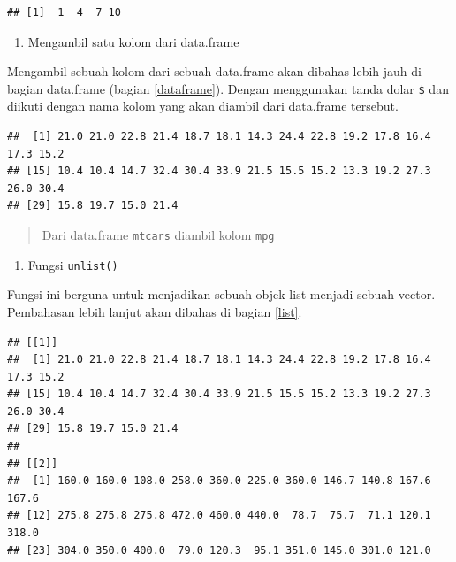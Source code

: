 \documentclass[]{book}
\newenvironment{Shaded}{\begin{snugshade}}{\end{snugshade}}
\newcommand{\KeywordTok}[1]{\textcolor[rgb]{0.13,0.29,0.53}{\textbf{#1}}}
\newcommand{\NormalTok}[1]{#1}
\newcommand{\OperatorTok}[1]{\textcolor[rgb]{0.81,0.36,0.00}{\textbf{#1}}}
\newcommand{\StringTok}[1]{\textcolor[rgb]{0.31,0.60,0.02}{#1}}
\providecommand{\tightlist}{%
  \setlength{\itemsep}{0pt}\setlength{\parskip}{0pt}}
\begin{document}
\begin{verbatim}
## [1]  1  4  7 10
\end{verbatim}

\begin{enumerate}
\def\labelenumi{\arabic{enumi}.}
\setcounter{enumi}{3}
\tightlist
\item
  Mengambil satu kolom dari data.frame
\end{enumerate}

Mengambil sebuah kolom dari sebuah data.frame akan dibahas lebih jauh di bagian data.frame (bagian \ref{dataframe}). Dengan menggunakan tanda dolar \texttt{\$} dan diikuti dengan nama kolom yang akan diambil dari data.frame tersebut.

\begin{Shaded}
\end{Shaded}

\begin{verbatim}
##  [1] 21.0 21.0 22.8 21.4 18.7 18.1 14.3 24.4 22.8 19.2 17.8 16.4 17.3 15.2
## [15] 10.4 10.4 14.7 32.4 30.4 33.9 21.5 15.5 15.2 13.3 19.2 27.3 26.0 30.4
## [29] 15.8 19.7 15.0 21.4
\end{verbatim}

\begin{quote}
Dari data.frame \texttt{mtcars} diambil kolom \texttt{mpg}
\end{quote}

\begin{enumerate}
\def\labelenumi{\arabic{enumi}.}
\setcounter{enumi}{4}
\tightlist
\item
  Fungsi \texttt{unlist()}
\end{enumerate}

Fungsi ini berguna untuk menjadikan sebuah objek list menjadi sebuah vector. Pembahasan lebih lanjut akan dibahas di bagian \ref{list}.

\begin{Shaded}
\end{Shaded}

\begin{verbatim}
## [[1]]
##  [1] 21.0 21.0 22.8 21.4 18.7 18.1 14.3 24.4 22.8 19.2 17.8 16.4 17.3 15.2
## [15] 10.4 10.4 14.7 32.4 30.4 33.9 21.5 15.5 15.2 13.3 19.2 27.3 26.0 30.4
## [29] 15.8 19.7 15.0 21.4
## 
## [[2]]
##  [1] 160.0 160.0 108.0 258.0 360.0 225.0 360.0 146.7 140.8 167.6 167.6
## [12] 275.8 275.8 275.8 472.0 460.0 440.0  78.7  75.7  71.1 120.1 318.0
## [23] 304.0 350.0 400.0  79.0 120.3  95.1 351.0 145.0 301.0 121.0
\end{verbatim}
\end{document}
